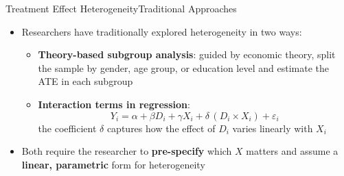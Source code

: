 \documentclass[hyperref={pdfpagelabels=false}]{beamer}
\begin{document}

\begin{frame}{Treatment Effect Heterogeneity}{Traditional Approaches}
\begin{itemize}
  \item Researchers have traditionally explored heterogeneity in two ways:
  \vspace{0.2cm}
  \begin{itemize}
    \item[1.] \textbf{Theory-based subgroup analysis}: guided by economic theory, split the sample by gender, age group, or education level and estimate the ATE in each subgroup
    \vspace{0.15cm}
    \item[2.] \textbf{Interaction terms in regression}:
    \[
      Y_i = \alpha + \beta D_i + \gamma X_i + \delta\,(D_i \times X_i) + \varepsilon_i
    \]
    the coefficient $\delta$ captures how the effect of $D_i$ varies linearly with $X_i$
  \end{itemize}
  \vspace{0.2cm}
  \item Both require the researcher to \textbf{pre-specify} which $X$ matters and assume a \textbf{linear, parametric} form for heterogeneity
\end{itemize}
\end{frame}
\end{document}
